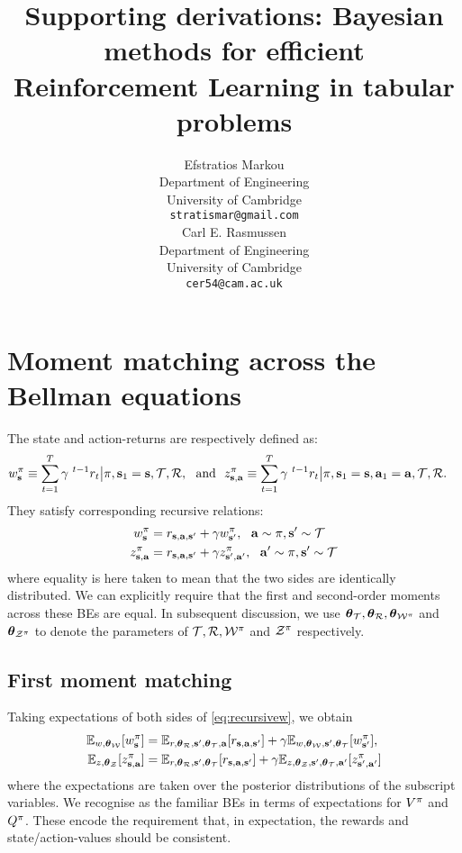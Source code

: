 \documentclass{article}
\title{Supporting derivations: Bayesian methods for efficient Reinforcement Learning in tabular problems}
\author{%
  Efstratios Markou \\
  Department of Engineering\\
  University of Cambridge\\
  \texttt{stratismar@gmail.com} \\
  \And
  Carl E. Rasmussen \\
  Department of Engineering\\
  University of Cambridge\\
  \texttt{cer54@cam.ac.uk}
}
\begin{document}
\maketitle



\section*{Moment matching across the Bellman equations}

The state and action-returns are respectively defined as:
\begin{align*}
w^\pi_{\mathbf{s}} &\equiv \sum_{t = 1}^T \gamma^{~t - 1} r_t \big| \pi, \mathbf{s}_1 = \mathbf{s}, \mathcal{T}, \mathcal{R}, ~ \text{ and } ~ z^\pi_{\mathbf{s}, \mathbf{a}} \equiv \sum_{t = 1}^T \gamma^{~t - 1} r_t \big| \pi, \mathbf{s}_1 = \mathbf{s}, \mathbf{a}_1 = \mathbf{a}, \mathcal{T}, \mathcal{R}.
\end{align*}
They satisfy corresponding recursive relations:
\begin{align} \label{eq:recursivew}
w^\pi_{\mathbf{s}} &=  r_{\mathbf{s}, \mathbf{a}, \mathbf{s}'} + \gamma w^\pi_{\mathbf{s}'}, ~~ \mathbf{a} \sim \pi, \mathbf{s}' \sim \mathcal{T}\\
z^\pi_{\mathbf{s}, \mathbf{a}} &=  r_{\mathbf{s}, \mathbf{a}, \mathbf{s}'} + \gamma z^\pi_{\mathbf{s}', \mathbf{a}'}, ~~ \mathbf{a}' \sim \pi, \mathbf{s}' \sim \mathcal{T} \label{eq:recursivez}
\end{align}
where equality is here taken to mean that the two sides are identically distributed. We can explicitly require that the first and second-order moments across these BEs are equal. In subsequent discussion, we use $\boldsymbol{\theta}_{\mathcal{T}}, \boldsymbol{\theta}_{\mathcal{R}}, \boldsymbol{\theta}_{\mathcal{W}^\pi}$ and $\boldsymbol{\theta}_{\mathcal{Z}^\pi}$ to denote the parameters of $\mathcal{T}, \mathcal{R}, \mathcal{W}^\pi$ and $\mathcal{Z}^\pi$ respectively.

\subsection*{First moment matching}

Taking expectations of both sides of \cref{eq:recursivew}, we obtain
\begin{equation}\label{muconsist}
\begin{aligned} 
\mathbb{E}_{w, \boldsymbol{\theta}_{\mathcal{W}}}[w^\pi_{\mathbf{s}}] &=  \mathbb{E}_{r, \boldsymbol{\theta}_{\mathcal{R}}, \mathbf{s}', \boldsymbol{\theta}_{\mathcal{T}}, \mathbf{a}}[r_{\mathbf{s}, \mathbf{a}, \mathbf{s}'}] + \gamma  \mathbb{E}_{w, \boldsymbol{\theta}_{\mathcal{W}}, \mathbf{s}', \boldsymbol{\theta}_{\mathcal{T}}}[w^\pi_{\mathbf{s}'}], \\
\mathbb{E}_{z, \boldsymbol{\theta}_{\mathcal{Z}}}[z^\pi_{\mathbf{s}, \mathbf{a}}] &=  \mathbb{E}_{r, \boldsymbol{\theta}_{\mathcal{R}}, \mathbf{s}', \boldsymbol{\theta}_{\mathcal{T}}}[r_{\mathbf{s}, \mathbf{a}, \mathbf{s}'}] + \gamma \mathbb{E}_{z, \boldsymbol{\theta}_{\mathcal{Z}}, \mathbf{s}', \boldsymbol{\theta}_{\mathcal{T}}, \mathbf{a}'}[z^\pi_{\mathbf{s}', \mathbf{a}'}]
\end{aligned}
\end{equation}
where the expectations are taken over the posterior distributions of the subscript variables. We recognise as the familiar BEs in terms of expectations for $V^{\pi}$ and $Q^{\pi}$. These encode the requirement that, in expectation, the rewards and state/action-values should be consistent.
\end{document}
